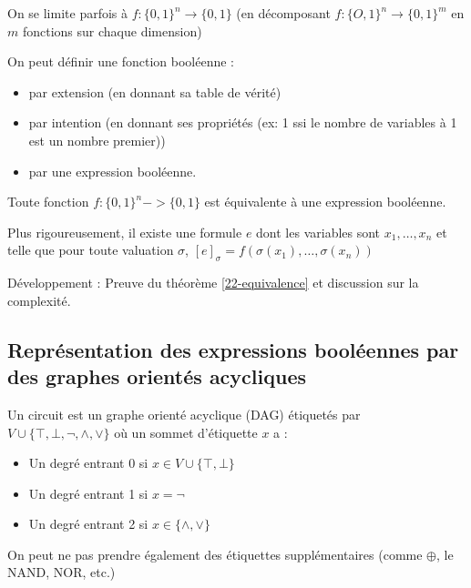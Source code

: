 \begin{rem}
	On se limite parfois à $f : \{0,1\}^n \to \{0, 1\}$ (en décomposant $f : \{O, 1\}^n \to \{0, 1\}^m$ en $m$ fonctions sur chaque dimension)
\end{rem}

On peut définir une fonction booléenne : \begin{itemize}
	\item par extension (en donnant sa table de vérité)
	\item par intention (en donnant ses propriétés (ex: 1 ssi le nombre de variables à 1 est un nombre premier))
	\item par une expression booléenne.
\end{itemize}

\begin{theorem}
	\label{22-equivalence}
	Toute fonction $f:\{0,1\}^n -> \{0,1\}$ est équivalente à une expression booléenne.
	
	Plus rigoureusement, il existe une formule $e$ dont les variables sont $x_1, \dots, x_n$ et telle que pour toute valuation $\sigma$, $[e]_\sigma = f(\sigma(x_1), \dots, \sigma(x_n))$
\end{theorem}

\par{Développement :} Preuve du théorème \ref{22-equivalence} et discussion sur la complexité.

\subsection{Représentation des expressions booléennes par des graphes orientés acycliques}

\begin{definition}
	Un circuit est un graphe orienté acyclique (DAG) étiquetés par $V \cup \{\top,\bot, \neg, \wedge, \vee \}$ où un sommet d'étiquette $x$ a : \begin{itemize}[label=$\bullet$]
		\item Un degré entrant 0 si $x \in V \cup \{\top, \bot\}$
		\item Un degré entrant 1 si $x = \neg$
		\item Un degré entrant 2 si $x \in \{\wedge, \vee\}$
	\end{itemize}
\end{definition}

\begin{rem}
	On peut ne pas prendre également des étiquettes supplémentaires (comme $\oplus$, le NAND, NOR, etc.)
\end{rem}

